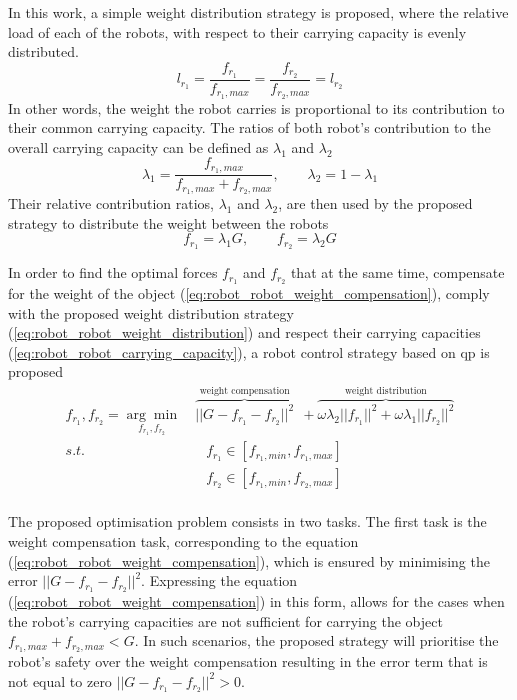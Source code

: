 In this work, a simple weight distribution strategy is proposed, where the relative load of each of the robots, with respect to their carrying capacity is evenly distributed. 
\begin{equation}
l_{r_1}= \frac{f_{r_1}}{f_{r_1,max}} = \frac{f_{r_2}}{f_{r_2,max}}=l_{r_2}
\end{equation}
In other words, the weight the robot carries is proportional to its contribution to their common carrying capacity. The ratios of both robot's contribution to the overall carrying capacity can be defined as $\lambda_1$ and $\lambda_2$
\begin{equation}
\lambda_1 = \frac{f_{r_1,max}}{f_{r_1,max} + f_{r_2,max}}, \qquad \lambda_2 = 1- \lambda_1
\end{equation}
Their relative contribution ratios, $\lambda_1$ and $\lambda_2$, are then used by the proposed strategy to distribute the weight between the robots
\begin{equation}
f_{r_1} = \lambda_1 G, \qquad f_{r_2} = \lambda_2 G
\label{eq:robot_robot_weight_distribution}
\end{equation}

In order to find the optimal forces $f_{r_1}$ and $f_{r_2}$ that at the same time, compensate for the weight of the object (\ref{eq:robot_robot_weight_compensation}), comply with the proposed weight distribution strategy (\ref{eq:robot_robot_weight_distribution}) and respect their carrying capacities (\ref{eq:robot_robot_carrying_capacity}), a robot control strategy based on \gls{qp} is proposed
\begin{equation}
\begin{split}
    f_{r_1}, f_{r_2} = \underset{f_{r_1},f_{r_2}}{\arg\min} &~\overbrace{||G - f_{r_1} -f_{r_2}||^2}^{\text{weight compensation}} ~~+ \overbrace{ \omega\lambda_2||f_{r_1}||^2 + \omega\lambda_1||f_{r_2}||^2}^{\text{weight distribution}}\\
    s.t.& \quad f_{r_1} \in[f_{r_1,min}, f_{r_1,max}]\\
    & \quad f_{r_2} \in[f_{r_1,min}, f_{r_2,max}]\\
\end{split}
\label{eq:qp_robot_robot}
\end{equation}

The proposed optimisation problem consists in two tasks. The first task is the weight compensation task, corresponding to the equation (\ref{eq:robot_robot_weight_compensation}), which is ensured by minimising the error $||G - f_{r_1} -f_{r_2}||^2$. Expressing the equation (\ref{eq:robot_robot_weight_compensation}) in this form, allows for the cases when the robot's carrying capacities are not sufficient for carrying the object $f_{r_1,max} + f_{r_2,max}<G$. In such scenarios, the proposed strategy will prioritise the robot's safety over the weight compensation resulting in the error term that is not equal to zero $||G - f_{r_1} -f_{r_2}||^2 > 0$.

